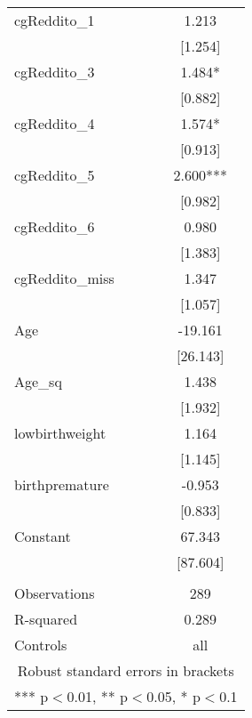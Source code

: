 \documentclass[]{article}
\begin{document}
\begin{tabular}{lc}
cgReddito\_1 & 1.213 \\
 & [1.254] \\
cgReddito\_3 & 1.484* \\
 & [0.882] \\
cgReddito\_4 & 1.574* \\
 & [0.913] \\
cgReddito\_5 & 2.600*** \\
 & [0.982] \\
cgReddito\_6 & 0.980 \\
 & [1.383] \\
cgReddito\_miss & 1.347 \\
 & [1.057] \\
Age & -19.161 \\
 & [26.143] \\
Age\_sq & 1.438 \\
 & [1.932] \\
lowbirthweight & 1.164 \\
 & [1.145] \\
birthpremature & -0.953 \\
 & [0.833] \\
Constant & 67.343 \\
 & [87.604] \\
 &  \\
Observations & 289 \\
R-squared & 0.289 \\
 Controls & all \\ \hline
\multicolumn{2}{c}{ Robust standard errors in brackets} \\
\multicolumn{2}{c}{ *** p$<$0.01, ** p$<$0.05, * p$<$0.1} \\
\end{tabular}
\end{document}
